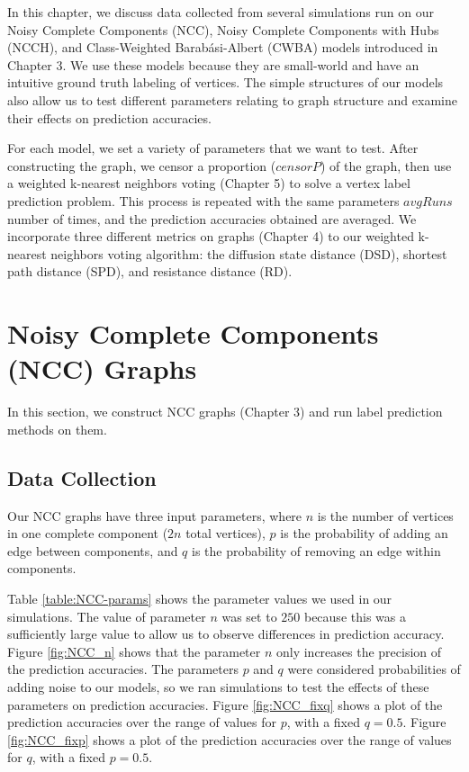 In this chapter, we discuss data collected from several simulations run on
our Noisy Complete Components (NCC), Noisy Complete Components with Hubs
(NCCH), and Class-Weighted Barab\'{a}si-Albert (CWBA) models introduced in
Chapter 3. We use these models because they are small-world and have an
intuitive ground truth labeling of vertices. The simple structures of our
models also allow us to test different parameters relating to graph 
structure and examine their effects on prediction accuracies.

For each model, we set a variety of parameters that we want to test.
After constructing the graph, we censor a proportion ($censorP$) of the 
graph, then use a weighted k-nearest neighbors voting (Chapter 5) to solve
a vertex label prediction problem. This process is repeated with the same
parameters $avgRuns$ number of times, and the prediction accuracies
obtained are averaged. We incorporate three different metrics on graphs
(Chapter 4) to our weighted k-nearest neighbors voting algorithm: 
the diffusion state distance (DSD), shortest path distance (SPD), and
resistance distance (RD).


\section{Noisy Complete Components (NCC) Graphs}
In this section, we construct NCC graphs (Chapter 3) and run label 
prediction methods on them.

\subsection{Data Collection}
Our NCC graphs have three input parameters, where $n$ is the number of
vertices in one complete component ($2n$ total vertices), $p$ is the
probability of adding an edge between components, and $q$ is the 
probability of removing an edge within components.

Table \ref{table:NCC-params} shows the parameter values we used in our
simulations. The value of parameter $n$ was set to $250$ because this was a
sufficiently large value to allow us to observe differences in prediction
accuracy. Figure \ref{fig:NCC_n} shows that the parameter $n$ only
increases the precision of the prediction accuracies. The parameters $p$
and $q$ were considered probabilities of adding noise to our models, so we
ran simulations to test the effects of these parameters on prediction
accuracies. Figure \ref{fig:NCC_fixq} shows a plot of the prediction
accuracies over the range of values for $p$, with a fixed $q=0.5$. Figure
\ref{fig:NCC_fixp} shows a plot of the prediction accuracies over the range
of values for $q$, with a fixed $p=0.5$.


